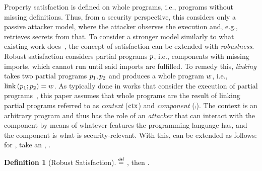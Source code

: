 \documentclass[dvipsnames,conference]{IEEEtran}
\theoremstyle{definition}
\newtheorem{definition}{Definition}[section]
\begin{document}
Property satisfaction is defined on whole programs, i.e., programs without missing definitions.
Thus, from a security perspective, this considers only a passive attacker model, where the attacker observes the execution and, e.g., retrieves secrets from that.
To consider a stronger model similarly to what existing work does~\cite{abate2019jour,abate2021extacc,maffeis2008code-carrying,gordon2003authenticity,fournet2007authorization,bengtson2011refine,backes2014uniontyps,michael2023mswasm,swasey2017robust,sammler2019benefits}, the concept of satisfaction can be extended with {\em robustness}.
Robust satisfaction considers partial programs $\progvar$, i.e., components with missing imports, which cannot run until said imports are fulfilled.
To remedy this, {\em linking} takes two partial programs $\progvar[_{1}],\progvar[_{2}]$ and produces a whole program $\wholeprogvar$, i.e., $\link{\progvar[_{1}]}{\progvar[_{2}]}=\wholeprogvar$.
As typically done in works that consider the execution of partial programs~\cite{abate2019jour,devriese2018parametricity,patrignani2021rsc,korashy2021capableptrs,strydonck2019lincap,devriese2017modular,bowman2015noninterference,ahmed2011equivcps,patterson2017linkingtyps},
this paper assumes that whole programs are the result of linking partial programs referred to as {\em context} ($\ctx$) and {\em component} ($\comp$).
The context is an arbitrary program and thus has the role of an {\em attacker} that can interact with the component by means of whatever features the programming language has, and the component is what is security-relevant.
With this,  can be extended as follows: for , take an , .

\begin{definition}[Robust Satisfaction]\label{def:proprsat}
  \bul{$\rsat{\progvar}{\pi}$}
  $\isdef$ , then \oul{$\sat{\wholeprogvar}{\pi}$}.
\end{definition}
\end{document}
